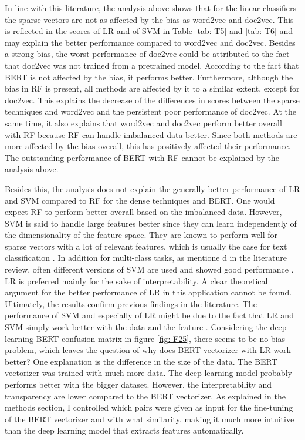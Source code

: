 \documentclass[12pt, a4paper, titlepage]{article}
\begin{document}
In line with this literature, the analysis above shows that for the linear classifiers the sparse vectors are not as affected by the bias as word2vec and doc2vec. This is reflected in the scores of LR and of SVM in Table \ref{tab: T5} and \ref{tab: T6} and may explain the better performance compared to word2vec and doc2vec. Besides a strong bias, the worst performance of doc2vec could be attributed to the fact that doc2vec was not trained from a pretrained model. According to the fact that \ac{BERT} is not affected by the bias, it performs better. Furthermore, although the bias in RF is present, all methods are affected by it to a similar extent, except for doc2vec. This explains the decrease of the differences in scores between the sparse techniques and word2vec and the persistent poor performance of doc2vec. At the same time, it also explains that word2vec and doc2vec perform better overall with RF because RF can handle imbalanced data better. Since both methods are more affected by the bias overall, this has positively affected their performance. The outstanding performance of \ac{BERT} with \ac{RF} cannot be explained by the analysis above.

Besides this, the analysis does not explain the generally better performance of LR and SVM compared to RF for the dense techniques and \ac{BERT}. One would expect RF to perform better overall based on the imbalanced data. However, \ac{SVM} is said to handle large features better since they can learn independently of the dimensionality of the feature space. They are known to perform well for sparse vectors with a lot of relevant features, which is usually the case for text classification \citep{Joachims1998}. In addition for multi-class tasks, as mentione
d in the literature review, often different versions of \ac{SVM} are used and showed good performance \citep{Aiolli2005, Angulo2003,Benabdeslem2006, guo2015, Mayoraz1999,Tang2019,tomar2015comparison}. \ac{LR} is preferred mainly for the sake of interpretability. A clear theoretical argument for the better performance of LR in this application cannot be found. Ultimately, the results confirm previous findings in the literature. The performance of SVM and especially of \ac{LR} might be due to the fact that \ac{LR} and \ac{SVM} simply work better with the data and the feature \citep{maglogiannis2007}. Considering the deep learning \ac{BERT} confusion matrix in figure \ref{fig: F25}, there seems to be no bias problem, which leaves the question of why does \ac{BERT} vectorizer with \ac{LR} work better? One explanation is the difference in the size of the data. The \ac{BERT} vectorizer was trained with much more data. The deep learning model probably performs better with the bigger dataset. However, the interpretability and transparency are lower compared to the \ac{BERT} vectorizer. As explained in the methods section, I controlled which pairs were given as input for the fine-tuning of the \ac{BERT} vectorizer and with what similarity, making it much more intuitive than the deep learning model that extracts features automatically. 
\end{document}
